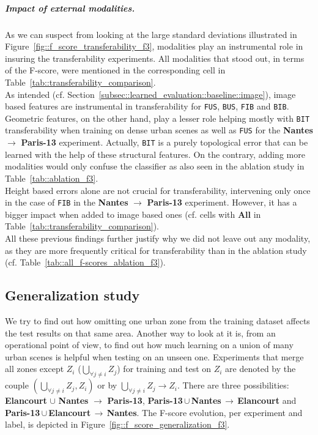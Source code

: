         \subparagraph{Impact of external modalities.}
            As we can suspect from looking at the large standard deviations illustrated in Figure~\ref{fig::f_score_transferability_f3}, modalities play an instrumental role in insuring the transferability experiments.
            All modalities that stood out, in terms of the F-score, were mentioned in the corresponding cell in Table~\ref{tab::transferability_comparison}.\\
            As intended (cf. Section~\ref{subsec::learned_evaluation::baseline::image}), image based features are instrumental in transferability for \texttt{FUS}, \texttt{BUS}, \texttt{FIB} and \texttt{BIB}.\\
            Geometric features, on the other hand, play a lesser role helping mostly with \texttt{BIT} transferability when training on dense urban scenes as well as \texttt{FUS} for the \textbf{Nantes} \(\rightarrow\) \textbf{Paris-13} experiment.
            Actually, \texttt{BIT} is a purely topological error that can be learned with the help of these structural features.
            On the contrary, adding more modalities would only confuse the classifier as also seen in the ablation study in Table~\ref{tab::ablation_f3}.\\
            Height based errors alone are not crucial for transferability, intervening only once in the case of \texttt{FIB} in the \textbf{Nantes} \(\rightarrow\) \textbf{Paris-13} experiment.
            However, it has a bigger impact when added to image based ones (cf. cells with \textbf{All} in Table~\ref{tab::transferability_comparison}).\\
            All these previous findings further justify why we did not leave out any modality, as they are more frequently critical for transferability than in the ablation study (cf. Table~\ref{tab::all_f-scores_ablation_f3}).

    \subsection{Generalization study}
        \label{subsec::experiments::scalability::generalization}
        We try to find out how omitting one urban zone from the training dataset affects the test results on that same area.
        Another way to look at it is, from an operational point of view, to find out how much learning on a union of many urban scenes is helpful when testing on an unseen one.
        Experiments that merge all zones except $Z_i$ ($\underset{\forall j \neq i}{\bigcup} Z_j$) for training and test on $Z_i$ are denoted by the couple $(\underset{\forall j \neq i}{\bigcup} Z_j, Z_i)$ or by $ \underset{\forall j \neq i}{\bigcup} Z_j \rightarrow Z_i$.
        There are three possibilities: \textbf{Elancourt} $\cup$ \textbf{Nantes} \(\rightarrow\) \textbf{Paris-13}, \mbox{\textbf{Paris-13}}\,$\cup$\,\textbf{Nantes}\,\(\rightarrow\)\,\textbf{Elancourt} and \mbox{\textbf{Paris-13}}\,$\cup$\,\textbf{Elancourt}\,\(\rightarrow\)\,\textbf{Nantes}.
        The F-score evolution, per experiment and label, is depicted in Figure~\ref{fig::f_score_generalization_f3}.\\
    
